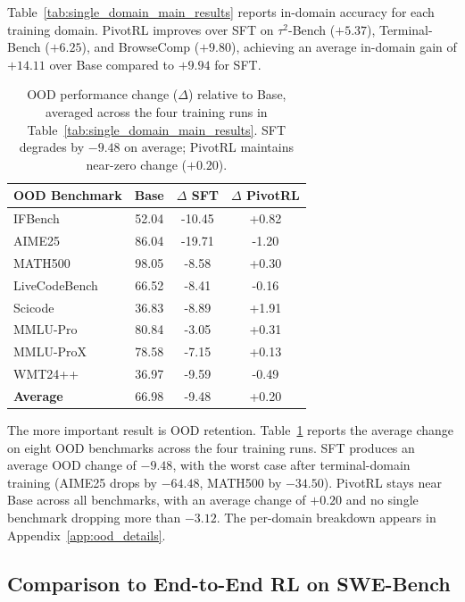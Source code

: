 Table~\ref{tab:single_domain_main_results} reports in-domain accuracy for each training domain. PivotRL improves over SFT on $\tau^2$-Bench ($+5.37$), Terminal-Bench ($+6.25$), and BrowseComp ($+9.80$), achieving an average in-domain gain of $+14.11$ over Base compared to $+9.94$ for SFT.

\begin{table}[t]
\centering
\small
\begin{tabular}{l c cc}
\toprule
\textbf{OOD Benchmark} & \textbf{Base} & \textbf{$\Delta$ SFT} & \textbf{$\Delta$ PivotRL} \\
\midrule
IFBench        & 52.04 & -10.45 & +0.82 \\
AIME25         & 86.04 & -19.71 & -1.20 \\
MATH500        & 98.05 & -8.58  & +0.30 \\
LiveCodeBench  & 66.52 & -8.41  & -0.16 \\
Scicode        & 36.83 & -8.89  & +1.91 \\
MMLU-Pro       & 80.84 & -3.05  & +0.31 \\
MMLU-ProX      & 78.58 & -7.15  & +0.13 \\
WMT24++        & 36.97 & -9.59  & -0.49 \\
\midrule
\textbf{Average} & 66.98 & -9.48 & +0.20 \\
\bottomrule
\end{tabular}
\caption{
OOD performance change ($\Delta$) relative to Base, averaged across the four training runs in Table~\ref{tab:single_domain_main_results}. SFT degrades by $-9.48$ on average; PivotRL maintains near-zero change ($+0.20$).
}
\label{tab:single_domain_ood_avg}
\end{table}

The more important result is OOD retention. Table~\ref{tab:single_domain_ood_avg} reports the average change on eight OOD benchmarks across the four training runs. SFT produces an average OOD change of $-9.48$, with the worst case after terminal-domain training (AIME25 drops by $-64.48$, MATH500 by $-34.50$). PivotRL stays near Base across all benchmarks, with an average change of $+0.20$ and no single benchmark dropping more than $-3.12$. The per-domain breakdown appears in Appendix~\ref{app:ood_details}.

\subsection{Comparison to End-to-End RL on SWE-Bench}
\label{sec:swe_e2e}

